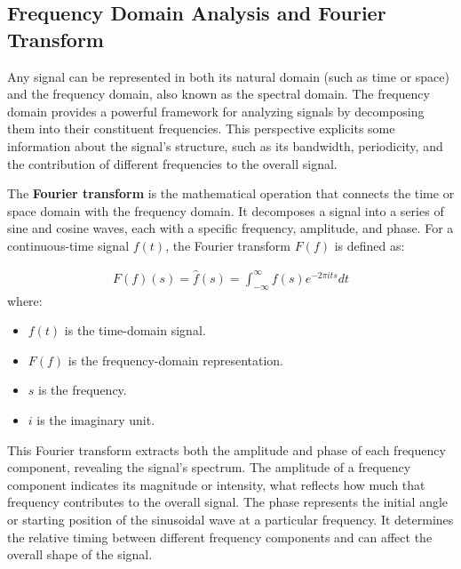 



\subsection{Frequency Domain Analysis and Fourier Transform}

Any signal can be represented in both its natural domain (such as time or space) and the frequency domain, also known as the spectral domain. The frequency domain provides a powerful framework for analyzing signals by decomposing them into their constituent frequencies. This perspective explicits some information about the signal's structure, such as its bandwidth, periodicity, and the contribution of different frequencies to the overall signal.

The \textbf{Fourier transform} is the mathematical operation that connects the time or space domain with the frequency domain. It decomposes a signal into a series of sine and cosine waves, each with a specific frequency, amplitude, and phase. For a continuous-time signal \( f(t) \), the Fourier transform \( F(f) \) is defined as:

\begin{align}
  F(f)(s) = \hat{f}(s) = \int_{-\infty}^{\infty} f(s) e^{-2\pi i t s} dt
\end{align}
where:

\begin{itemize}
  \item \( f(t) \) is the time-domain signal.
  \item \( F(f) \) is the frequency-domain representation.
  \item \( s \) is the frequency.
  \item \( i \) is the imaginary unit.
\end{itemize}

This Fourier transform extracts both the amplitude and phase of each frequency component, revealing the signal's spectrum. The amplitude of a frequency component indicates its magnitude or intensity, what reflects how much that frequency contributes to the overall signal. The phase represents the initial angle or starting position of the sinusoidal wave at a particular frequency. It determines the relative timing between different frequency components and can affect the overall shape of the signal.

